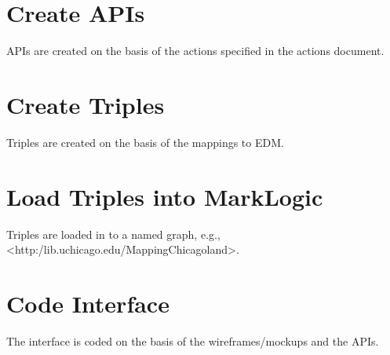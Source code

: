 \documentclass[11pt]{article}
\begin{document}
\section{Create APIs}
\label{sec:orga18dd90}
APIs are created on the basis of the actions specified in the actions document.

\section{Create Triples}
\label{sec:org5d34558}
Triples are created on the basis of the mappings to EDM.

\section{Load Triples into MarkLogic}
\label{sec:org4394135}
Triples are loaded in to a named graph, e.g., <http:/lib.uchicago.edu/MappingChicagoland>.

\section{Code Interface}
\label{sec:orgabf262e}
The interface is coded on the basis of the wireframes/mockups and the APIs.
\end{document}
